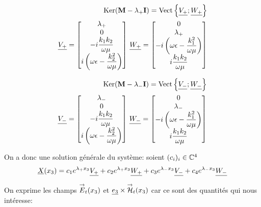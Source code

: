 \begin{align}
\operatorname{Ker}(\mathbf{M}-\lambda_+\mathbf{I})=\operatorname{Vect}\left\lbrace\underline{V_+};\underline{W_+}\right\rbrace \\
    \underline{V_+} = 
    \begin{bmatrix}
    \lambda_+ \\
        0 \\
        -i\dfrac{k_1k_2}{\omega\mu} \\
        i\left(\omega\epsilon - \dfrac{k_2^2}{\omega\mu}\right) \\
    \end{bmatrix}
    \,
    \underline{W_+} = 
        \begin{bmatrix}
        0 \\
        \lambda_+ \\
        -i\left(\omega\epsilon - \dfrac{k_1^2}{\omega\mu}\right) \\
        i\dfrac{k_1k_2}{\omega\mu} \\
    \end{bmatrix}
\end{align}

\begin{align}
\operatorname{Ker}(\mathbf{M}-\lambda_-\mathbf{I})=\operatorname{Vect}\left\lbrace\underline{V_-};\underline{W_-}\right\rbrace\\
    \underline{V_-} = 
    \begin{bmatrix}
        \lambda_- \\
        0 \\
        -i\dfrac{k_1k_2}{\omega\mu} \\
        i\left(\omega\epsilon - \dfrac{k_2^2}{\omega\mu}\right) \\
    \end{bmatrix}
    \,
    \underline{W_-} = 
    \begin{bmatrix}
        0 \\
        \lambda_- \\
        -i\left(\omega\epsilon - \dfrac{k_1^2}{\omega\mu}\right) \\
        i\dfrac{k_1k_2}{\omega\mu} \\
    \end{bmatrix}
\end{align}

On a donc une solution générale du système: soient $(c_i)_{i} \in \mathbb C^4$
\begin{equation}
    \underline{X}(x_3) = c_1e^{\lambda_+ x_3}\underline{V_+}  + c_2e^{\lambda_+ x_3}\underline{W_+} + c_3e^{\lambda_- x_3}\underline{V_-} +c_4e^{\lambda_- x_3}\underline{W_-}
\end{equation}

On exprime les champs ${\overset{\rightarrow}{E}}_t(x_3)$ et $\underline{e_3} \times {\overset{\rightarrow}{\mathcal{H}}}_t(x_3)$ car ce sont des quantités qui nous intéresse:

